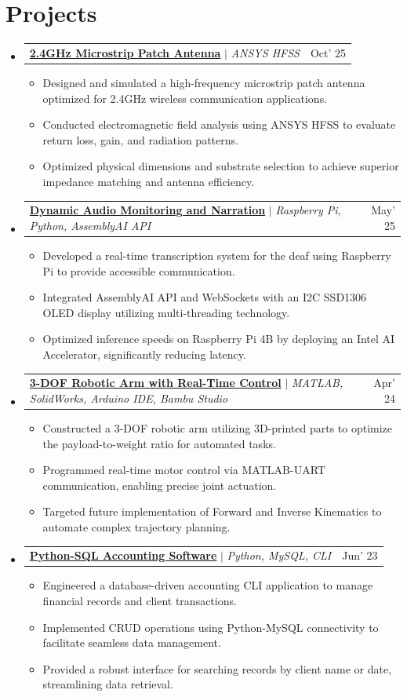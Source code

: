 \documentclass[letterpaper,10pt]{article}
\makeatletter
\newcommand{\resumeItem}[1]{\item\small{#1 \vspace{-2pt}}}
\newcommand{\resumeProjectHeading}[2]{
    \item
    \begin{tabular*}{0.97\textwidth}{@{}l @{\extracolsep{\fill}} r@{}}
      \small#1 & #2 \\
    \end{tabular*}
    \vspace{-7pt}
}
\newcommand{\resumeSubHeadingListStart}{\begin{itemize}[leftmargin=0.15in, label={}]}
\newcommand{\resumeSubHeadingListEnd}{\end{itemize}\vspace{-2pt}}
\newcommand{\resumeItemListStart}{\begin{itemize}}
\newcommand{\resumeItemListEnd}{\end{itemize}\vspace{-5pt}}
\makeatother
\begin{document}
\section{Projects}
    \resumeSubHeadingListStart
      \resumeProjectHeading
          {\textbf{\href{https://github.com/som-anshu/2.4GHz-microstrip-patch-antenna}{2.4GHz Microstrip Patch Antenna}} $|$ \emph{ANSYS HFSS}}{Oct' 25}
          \resumeItemListStart
            \resumeItem{Designed and simulated a high-frequency microstrip patch antenna optimized for 2.4GHz wireless communication applications.}
            \resumeItem{Conducted electromagnetic field analysis using ANSYS HFSS to evaluate return loss, gain, and radiation patterns.}
            \resumeItem{Optimized physical dimensions and substrate selection to achieve superior impedance matching and antenna efficiency.}
          \resumeItemListEnd
      \resumeProjectHeading
          {\textbf{\href{https://github.com/som-anshu/damn}{Dynamic Audio Monitoring and Narration}} $|$ \emph{Raspberry Pi, Python, AssemblyAI API}}{May' 25}
          \resumeItemListStart
            \resumeItem{Developed a real-time transcription system for the deaf using Raspberry Pi to provide accessible communication.}
            \resumeItem{Integrated AssemblyAI API and WebSockets with an I2C SSD1306 OLED display utilizing multi-threading technology.}
            \resumeItem{Optimized inference speeds on Raspberry Pi 4B by deploying an Intel AI Accelerator, significantly reducing latency.}
          \resumeItemListEnd
      \resumeProjectHeading
          {\textbf{\href{https://github.com/som-anshu/MATLAB-controlled-robotic-manipulator}{3-DOF Robotic Arm with Real-Time Control}} $|$ \emph{MATLAB, SolidWorks, Arduino IDE, Bambu Studio}}{Apr' 24}
          \resumeItemListStart
            \resumeItem{Constructed a 3-DOF robotic arm utilizing 3D-printed parts to optimize the payload-to-weight ratio for automated tasks.}
            \resumeItem{Programmed real-time motor control via MATLAB-UART communication, enabling precise joint actuation.}
            \resumeItem{Targeted future implementation of Forward and Inverse Kinematics to automate complex trajectory planning.}
          \resumeItemListEnd
      \resumeProjectHeading
          {\textbf{\href{https://github.com/som-anshu/python-mysql-accounting}{Python-SQL Accounting Software}} $|$ \emph{Python, MySQL, CLI}}{Jun' 23}
          \resumeItemListStart
            \resumeItem{Engineered a database-driven accounting CLI application to manage financial records and client transactions.}
            \resumeItem{Implemented CRUD operations using Python-MySQL connectivity to facilitate seamless data management.}
            \resumeItem{Provided a robust interface for searching records by client name or date, streamlining data retrieval.}
          \resumeItemListEnd
    \resumeSubHeadingListEnd
\end{document}
